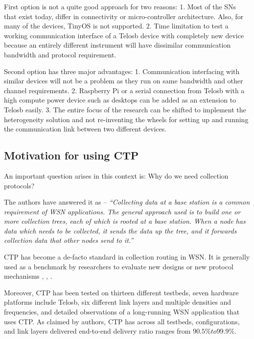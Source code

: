     First option is not a quite good approach for two reasons: 1. Most of the \acp{SN} that exist today, differ in connectivity or micro-controller architecture. Also, for many of the devices, TinyOS is not supported. 2. Time limitation to test a working communication interface of a Telosb device with completely new device because an entirely different instrument will have dissimilar communication bandwidth and protocol requirement.
    
    \par
    Second option has three major advantages: 1. Communication interfacing with similar devices will not be a problem as they run on same bandwidth and other channel requirements. 2. Raspberry Pi or a serial connection from Telosb with a high compute power device such as desktops can be added as an extension to Telosb easily. 3. The entire focus of the research can be shifted to implement the heterogeneity solution and not re-inventing the wheels for setting up and running the communication link between two different devices.
    
    \subsection*{Motivation for using \ac{CTP}}
    
    An important question arises in this context is: Why do we need collection protocols?
    
    The authors \cite{TEP:119} have answered it as – \textit{ “Collecting data at a base station is a common requirement of \ac{WSN} applications. The general approach used is to build one or more collection trees, each of which is rooted at a base station. When a node has data which needs to be collected, it sends the data up the tree, and it forwards collection data that other nodes send to it.” }
    
    \ac{CTP} has become a de-facto standard in collection routing in \ac{WSN}. It is generally used as a benchmark by researchers to evaluate new designs or new protocol mechanisms \cite{moeller2010routing}, \cite{Hackmann:2008}, \cite{Alizai:2009}.
    \par
    Moreover, \ac{CTP} \cite{Gnawali:2013} has been tested on thirteen different testbeds, seven hardware platforms include Telosb, six different link layers and multiple densities and frequencies, and detailed observations of a long-running \ac{WSN} application that uses \ac{CTP}. As claimed by authors, \ac{CTP} has across all testbeds, configurations, and link layers delivered end-to-end delivery ratio ranges from $ 90.5\% to 99.9\% $.
    
